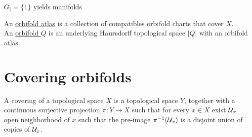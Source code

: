 \begin{remark}
$G_i=\{1\}$ yields manifolds
\end{remark}

\begin{defn}
An \underline{orbifold atlas} is a collection of compatibles orbifold charts that cover $X$.\\
An \underline{orbifold $Q$} is an underlying Haursdorff topological space $|Q|$ with an orbifold atlas.
\end{defn}

\section{Covering orbifolds}

A covering of a topological space $X$ is a topological space $Y$, together with a continuous surjective projection $\pi: Y\rightarrow X$ such that for every $x\in X$ exist $\mathcal{U}_x$ open neighborhood of $x$ such that the pre-image $\pi^{-1}(\mathcal{U}_x)$ is a disjoint union of copies of $\mathcal{U}_x$.



